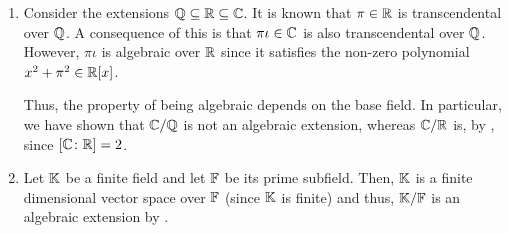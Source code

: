 \begin{ex}
    \phantom{hi}
    \begin{enumerate}
        \item Consider the extensions $\mathbb{Q} \subseteq \mathbb{R} \subseteq \mathbb{C}$. It is known that $\pi \in \mathbb{R}$ is transcendental over $\mathbb{Q}$. A consequence of this is that $\pi \iota \in \mathbb{C}$ is also transcendental over $\mathbb{Q}$. However, $\pi \iota$ is algebraic over $\mathbb{R}$ since it satisfies the non-zero polynomial $x^2 + \pi^2 \in \mathbb{R}[x]$. 
        
        
        Thus, the property of being algebraic depends on the base field. In particular, we have shown that $\mathbb{C}/\mathbb{Q}$ is not an algebraic extension, whereas $\mathbb{C}/\mathbb{R}$ is, by , since $[\mathbb{C} \colon \mathbb{R}] = 2$.
        
        \item Let $\mathbb{K}$ be a finite field and let $\mathbb{F}$ be its prime subfield. Then, $\mathbb{K}$ is a finite dimensional vector space over $\mathbb{F}$ (since $\mathbb{K}$ is finite) and thus, $\mathbb{K}/\mathbb{F}$ is an algebraic extension by .
    \end{enumerate}
\end{ex}

